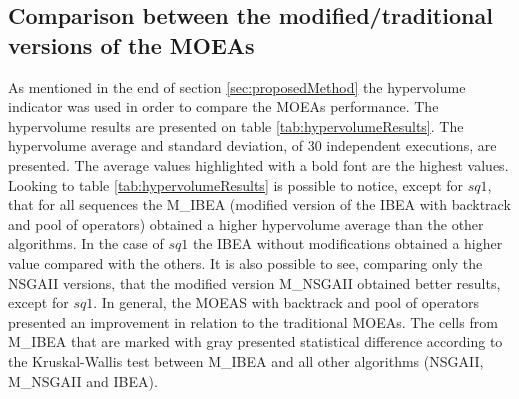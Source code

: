 \subsection{Comparison between the modified/traditional versions of the MOEAs}


As mentioned in the end of section \ref{sec:proposedMethod} the hypervolume indicator was used in order to compare the MOEAs performance. The hypervolume results are presented on table \ref{tab:hypervolumeResults}. The hypervolume average and standard deviation, of 30 independent executions, are presented. The average values highlighted with a bold font are the highest values. 
Looking to table \ref{tab:hypervolumeResults} is possible to notice, except for $sq1$, that for all sequences the M\_IBEA (modified version of the IBEA with backtrack and pool of operators) obtained a higher hypervolume average than the other algorithms. In the case of $sq1$ the IBEA without modifications obtained a higher value compared with the others. It is also possible to see, comparing only the NSGAII versions, that the modified version M\_NSGAII obtained better results, except for $sq1$. In general, the MOEAS with backtrack and pool of operators presented an improvement in relation to the traditional MOEAs. The cells from M\_IBEA that are marked with gray presented statistical difference according to the Kruskal-Wallis test \cite{mckight2010kruskal} between M\_IBEA and all other algorithms (NSGAII, M\_NSGAII and IBEA). 

   

